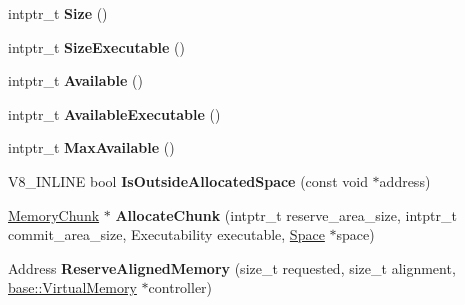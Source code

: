 \begin{DoxyCompactItemize}
\item 
intptr\+\_\+t {\bfseries Size} ()\hypertarget{classv8_1_1internal_1_1_memory_allocator_a0e1e4827e1a7833c734af2d992c9b719}{}\label{classv8_1_1internal_1_1_memory_allocator_a0e1e4827e1a7833c734af2d992c9b719}

\item 
intptr\+\_\+t {\bfseries Size\+Executable} ()\hypertarget{classv8_1_1internal_1_1_memory_allocator_ac1bd4519f35220f21ae1b299d95682b3}{}\label{classv8_1_1internal_1_1_memory_allocator_ac1bd4519f35220f21ae1b299d95682b3}

\item 
intptr\+\_\+t {\bfseries Available} ()\hypertarget{classv8_1_1internal_1_1_memory_allocator_a46c4c3bcc1674e7b1e8facb4e435998d}{}\label{classv8_1_1internal_1_1_memory_allocator_a46c4c3bcc1674e7b1e8facb4e435998d}

\item 
intptr\+\_\+t {\bfseries Available\+Executable} ()\hypertarget{classv8_1_1internal_1_1_memory_allocator_aa07c912f24a740e537533d67211233f3}{}\label{classv8_1_1internal_1_1_memory_allocator_aa07c912f24a740e537533d67211233f3}

\item 
intptr\+\_\+t {\bfseries Max\+Available} ()\hypertarget{classv8_1_1internal_1_1_memory_allocator_ae9a3874baee3a04e0d5a15fa48fb7a23}{}\label{classv8_1_1internal_1_1_memory_allocator_ae9a3874baee3a04e0d5a15fa48fb7a23}

\item 
V8\+\_\+\+I\+N\+L\+I\+NE bool {\bfseries Is\+Outside\+Allocated\+Space} (const void $\ast$address)\hypertarget{classv8_1_1internal_1_1_memory_allocator_a3a6bd72d409f0665e79b6d722ee6e9a0}{}\label{classv8_1_1internal_1_1_memory_allocator_a3a6bd72d409f0665e79b6d722ee6e9a0}

\item 
\hyperlink{classv8_1_1internal_1_1_memory_chunk}{Memory\+Chunk} $\ast$ {\bfseries Allocate\+Chunk} (intptr\+\_\+t reserve\+\_\+area\+\_\+size, intptr\+\_\+t commit\+\_\+area\+\_\+size, Executability executable, \hyperlink{classv8_1_1internal_1_1_space}{Space} $\ast$space)\hypertarget{classv8_1_1internal_1_1_memory_allocator_a2eb140916a1ace7dc8bba8f363cc46e5}{}\label{classv8_1_1internal_1_1_memory_allocator_a2eb140916a1ace7dc8bba8f363cc46e5}

\item 
Address {\bfseries Reserve\+Aligned\+Memory} (size\+\_\+t requested, size\+\_\+t alignment, \hyperlink{classv8_1_1base_1_1_virtual_memory}{base\+::\+Virtual\+Memory} $\ast$controller)\hypertarget{classv8_1_1internal_1_1_memory_allocator_a970ee92239f45e7e3d73b3c7b259d24d}{}\label{classv8_1_1internal_1_1_memory_allocator_a970ee92239f45e7e3d73b3c7b259d24d}


\end{DoxyCompactItemize}
